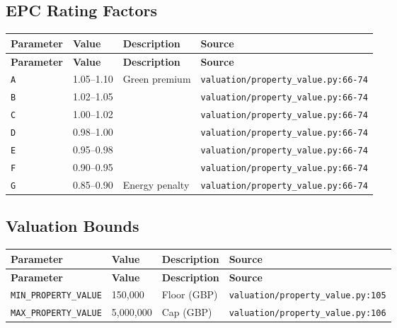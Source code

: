 \documentclass[11pt,a4paper]{article}
\begin{document}
\subsection{EPC Rating Factors}

\begin{longtable}{p{4cm}p{4cm}p{5.5cm}p{3.5cm}}
    \toprule
    \textbf{Parameter} & \textbf{Value} & \textbf{Description} & \textbf{Source} \\
    \midrule
    \endfirsthead
    \toprule
    \textbf{Parameter} & \textbf{Value} & \textbf{Description} & \textbf{Source} \\
    \midrule
    \endhead
    \bottomrule
    \endfoot
    \texttt{A} & 1.05--1.10 & Green premium & {\scriptsize \texttt{valuation/property\_value.py:66-74}} \\
    \texttt{B} & 1.02--1.05 &  & {\scriptsize \texttt{valuation/property\_value.py:66-74}} \\
    \texttt{C} & 1.00--1.02 &  & {\scriptsize \texttt{valuation/property\_value.py:66-74}} \\
    \texttt{D} & 0.98--1.00 &  & {\scriptsize \texttt{valuation/property\_value.py:66-74}} \\
    \texttt{E} & 0.95--0.98 &  & {\scriptsize \texttt{valuation/property\_value.py:66-74}} \\
    \texttt{F} & 0.90--0.95 &  & {\scriptsize \texttt{valuation/property\_value.py:66-74}} \\
    \texttt{G} & 0.85--0.90 & Energy penalty & {\scriptsize \texttt{valuation/property\_value.py:66-74}} \\
\end{longtable}

\subsection{Valuation Bounds}

\begin{longtable}{p{4cm}p{4cm}p{5.5cm}p{3.5cm}}
    \toprule
    \textbf{Parameter} & \textbf{Value} & \textbf{Description} & \textbf{Source} \\
    \midrule
    \endfirsthead
    \toprule
    \textbf{Parameter} & \textbf{Value} & \textbf{Description} & \textbf{Source} \\
    \midrule
    \endhead
    \bottomrule
    \endfoot
    \texttt{MIN\_PROPERTY\_VALUE} & 150,000 & Floor (GBP) & {\scriptsize \texttt{valuation/property\_value.py:105}} \\
    \texttt{MAX\_PROPERTY\_VALUE} & 5,000,000 & Cap (GBP) & {\scriptsize \texttt{valuation/property\_value.py:106}} \\
\end{longtable}
\end{document}
